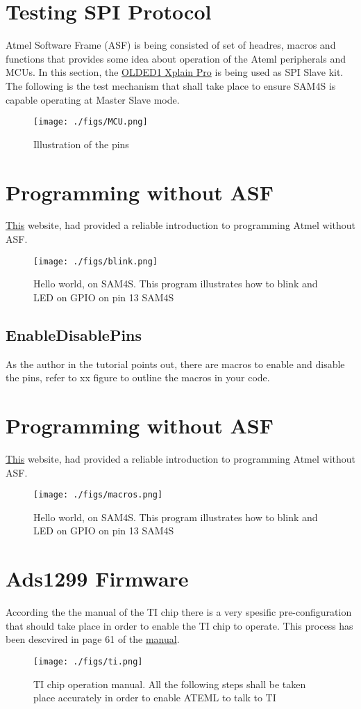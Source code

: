 \documentclass{IEEEtran}
\begin{document}
\section{Testing SPI Protocol}
Atmel Software Frame (ASF) is being consisted of set of headres, macros and functions that provides some idea about operation of the Ateml peripherals and MCUs. In this section, the \href {http://www.atmel.com/tools/ATOLED1-XPRO.aspx}{ OLDED1 Xplain Pro} is being used as SPI Slave kit. The following is the test mechanism that shall take place to ensure SAM4S is capable operating at Master Slave mode. 

\begin{figure}[h!]
\centering
\texttt{[image: ./figs/MCU.png]}
\caption{ Illustration of the pins}
\label{fig:MCUSchematics}
\end{figure}

\section{Programming without ASF}
\href{http://mwmw.ca/gpio.html}{This} website, had provided a reliable introduction to programming Atmel without ASF. 
\begin{figure}[h!]
\centering
\texttt{[image: ./figs/blink.png]}
\caption{ Hello world, on SAM4S. This program illustrates how to blink and LED on GPIO on pin 13 SAM4S}
\label{fig:blinkSAM4S}
\end{figure}

\subsection{EnableDisablePins}
As the author in the tutorial points out, there are macros to enable and disable the pins, refer to xx figure to outline the macros in your code. 
\section{Programming without ASF}
\href{http://mwmw.ca/gpio.html}{This} website, had provided a reliable introduction to programming Atmel without ASF. 
\begin{figure}[h!]
\centering
\texttt{[image: ./figs/macros.png]}
\caption{ Hello world, on SAM4S. This program illustrates how to blink and LED on GPIO on pin 13 SAM4S}
\label{fig:blinkSAM4S}
\end{figure}

\section{Ads1299 Firmware}
According the the manual of the TI chip there is a very spesific pre-configuration that should take place in order to enable the TI chip to operate. This process has been descvired in page 61 of the \href{http://www.compliahealth.com/products/procura-na/overview.htm}{manual}. 

\begin{figure}[h!]
\centering
\texttt{[image: ./figs/ti.png]}
\caption{ TI chip operation manual. All the following steps shall be taken place accurately in order to enable ATEML to talk to TI}
\label{fig:TIManual}
\end{figure}






\end{document}
